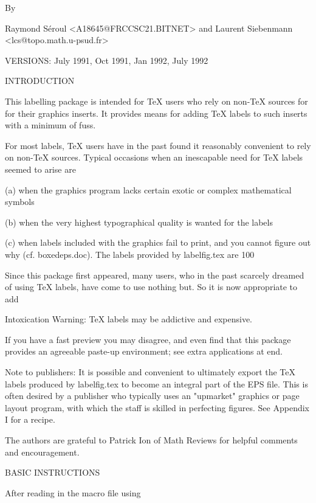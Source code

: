                                 By

              Raymond S\'eroul <A18645@FRCCSC21.BITNET>
                                and 
              Laurent Siebenmann <lcs@topo.math.u-psud.fr>
    
              VERSIONS: July 1991, Oct 1991, Jan 1992, July 1992


INTRODUCTION

      This labelling package is intended for TeX users who
rely on non-TeX sources for for their graphics inserts.  It
provides means for adding TeX labels to such inserts with a
minimum of fuss. 

       For most labels, TeX users have in the past found it
reasonably convenient to rely on non-TeX sources. Typical
occasions when an inescapable need for TeX labels seemed to
arise are

 (a) when the graphics program lacks certain exotic or complex
mathematical symbols

 (b) when the very highest typographical quality is wanted for the
labels

 (c) when labels included with the graphics fail to print, 
 and you cannot figure out why (cf. boxedeps.doc).  The labels
 provided by labelfig.tex are 100%

       Since this package first appeared, many users, who in the
past scarcely dreamed of using TeX labels, have come to use
nothing but.  So it is now appropriate to add

Intoxication Warning:  TeX labels may be addictive and expensive. 

     If you have a fast preview you may disagree, and even find
that this package provides an agreeable paste-up environment; see
extra applications at end.

     Note to publishers: It is possible and convenient to ultimately
export the TeX labels produced by labelfig.tex to become an integral
part of the EPS file. This is often desired by a publisher who typically
uses an "upmarket" graphics or page layout program, with which the
staff is skilled in perfecting figures.  See Appendix I for
a recipe.

     The authors are grateful to Patrick Ion of Math Reviews for
helpful comments and encouragement.


BASIC INSTRUCTIONS

    After reading in the macro file using

    

